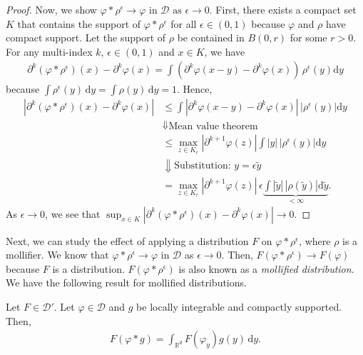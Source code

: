 \begin{proof}
    Now, we show $\varphi * \rho^\epsilon \to \varphi  \text{ in $\mathcal{D}$ as $\epsilon \to 0$}$. First, there exists a compact set $K$ that contains the support of $\varphi * \rho^\epsilon$ for all $\epsilon \in (0,1)$ because $\varphi$ and $\rho$ have compact support. Let the support of $\rho$ be contained in $B(0,r)$ for some $r > 0$. For any multi-index $k$, $\epsilon \in (0,1)$ and $x \in K$, we have
    \begin{align*}
        \partial^k(\varphi * \rho^\epsilon) (x) - \partial^k\varphi(x) = \int (\partial^k \varphi(x - y) - \partial^k \varphi(x)) \, \rho^{\epsilon}(y) \mathrm{d}y
    \end{align*}
    because $\int \rho^{\epsilon}(y) \, \mathrm{d} y = \int \rho(y) \, \mathrm{d} y = 1$. Hence, 
    \begin{align*}
        |\partial^k(\varphi * \rho^\epsilon) (x) - \partial^k\varphi(x)| 
        &\leq \int |\partial^k \varphi(x - y) - \partial^k \varphi(x)| \, |\rho^{\epsilon}(y)| \mathrm{d}y \\
        &\Downarrow \text{Mean value theorem} \\
        & \leq \max_{z \in K_r} |\partial^{k+1}\varphi(z)|  \int  |y| \, |\rho^{\epsilon}(y)| \mathrm{d}y \\
        &\Downarrow \text{Substitution: } y = \epsilon \tilde y \\
        &= \max_{z \in K_r} |\partial^{k+1}\varphi(z)| \, \epsilon  \underbrace{\int  |\tilde y| \, |\rho(\tilde y)| \mathrm{d}\tilde y}_{< \infty}.
    \end{align*}
    As $\epsilon \to 0$, we see that $\sup_{x \in K} |\partial^k(\varphi * \rho^\epsilon) (x) - \partial^k\varphi(x)| \to 0$. 
\end{proof}

Next, we can study the effect of applying a distribution $F$ on $\varphi * \rho^\epsilon$, where $\rho$ is a mollifier. We know that $\varphi * \rho^{\epsilon} \to \varphi$ in $\mathcal{D}$ as $\epsilon \to 0$. Then, $F(\varphi * \rho^{\epsilon}) \to F(\varphi)$ because $F$ is a distribution. $F(\varphi * \rho^{\epsilon})$ is also known as a \emph{mollified distribution}. We have the following result for mollified distributions.

\begin{lemma}
    Let $F \in \mathcal{D}'$. Let $\varphi \in \mathcal{D}$ and $g$ be locally integrable and compactly supported. Then,
    \begin{align}\label{lemma:mollified-distribution}
        F(\varphi * g) = \int_{\mathbb{R}^d} F(\varphi_y)g(y) \, \mathrm{d}y.
    \end{align}
\end{lemma}

